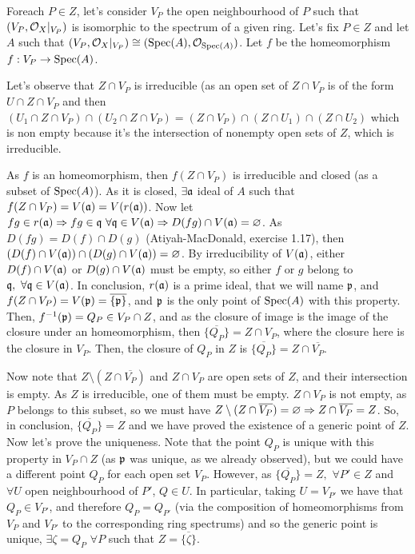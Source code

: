 \begin{sol}
	Foreach $P \in Z$, let's consider $V_P$ the open neighbourhood of $P$ such that $(V_P, \mathcal{O}_X|_{V_P})$ is isomorphic to the spectrum of a given ring. Let's fix $P \in Z$ and let $A$ such that $(V_P, \mathcal{O}_X|_{V_P}) \cong (\mathrm{Spec}(A), \mathcal{O}_{\mathrm{Spec}(A)})$. Let $f$ be the homeomorphism $f: V_P \to \mathrm{Spec}(A)$.

	Let's observe that $Z \cap V_P$ is irreducible (as an open set of $Z \cap V_P$ is of the form $U \cap Z \cap V_P$ and then $(U_1 \cap Z \cap V_P) \cap (U_2 \cap Z \cap V_P) = (Z \cap V_P) \cap (Z \cap U_1) \cap (Z \cap U_2)$ which is non empty because it's the intersection of nonempty open sets of $Z$, which is irreducible.

	As $f$ is an homeomorphism, then $f(Z\cap V_P)$ is irreducible and closed (as a subset of $\mathrm{Spec}(A)$). As it is closed, $\exists \mathfrak{a}$ ideal of $A$ such that $f(Z \cap V_P) = V(\mathfrak{a}) = V(r(\mathfrak{a}))$. Now let $fg \in r(\mathfrak{a}) \Rightarrow fg \in \mathfrak{q} \, \, \forall \mathfrak{q} \in V(\mathfrak{a}) \Rightarrow D(fg) \cap V(\mathfrak{a}) = \varnothing$. As $D(fg) = D(f) \cap D(g)$ (Atiyah-MacDonald, exercise 1.17), then $(D(f) \cap V(\mathfrak{a})) \cap (D(g) \cap V(\mathfrak{a})) = \varnothing$. By irreducibility of $V(\mathfrak{a})$, either $D(f) \cap V(\mathfrak{a})$ or $D(g) \cap V(\mathfrak{a})$ must be empty, so either $f$ or $g$ belong to $\mathfrak{q}, \, \, \forall \mathfrak{q} \in V(\mathfrak{a})$. In conclusion, $r(\mathfrak{a})$ is a prime ideal, that we will name $\mathfrak{p}$, and $f(Z \cap V_P) = V(\mathfrak{p}) = \overline{\{\mathfrak{p}\}}$, and $\mathfrak{p}$ is the only point of $\mathrm{Spec}(A)$ with this property. Then, $f^{-1}(\mathfrak{p}) = Q_P \in V_P \cap Z$, and as the closure of image is the image of the closure under an homeomorphism, then $\overline{\{Q_P\}} = Z \cap V_P$, where the closure here is the closure in $V_P$. Then, the closure of $Q_P$ in $Z$ is $\overline{\{Q_P\}} = Z \cap \overline{V_P}$.

	Now note that $Z \setminus (Z \cap \overline{V_P})$ and $Z \cap V_P$ are open sets of $Z$, and their intersection is empty. As $Z$ is irreducible, one of them must be empty. $Z \cap V_P$ is not empty, as $P$ belongs to this subset, so we must have $Z \setminus (Z \cap \overline{V_P}) = \varnothing \Rightarrow Z \cap \overline{V_P} = Z$. So, in conclusion, $\overline{\{Q_P\}} = Z$ and we have proved the existence of a generic point of $Z$. Now let's prove the uniqueness. Note that the point $Q_P$ is unique with this property in $V_P \cap Z$ (as $\mathfrak{p}$ was unique, as we already observed), but we could have a different point $Q_P$ for each open set $V_P$. However, as $\overline{\{Q_P\}} = Z, \, \, \forall P' \in Z$ and $\forall U$ open neighbourhood of $P'$, $Q \in U$. In particular, taking $U = V_{P'}$ we have that $Q_P \in V_{P'}$, and therefore $Q_P = Q_{P'}$ (via the composition of homeomorphisms from $V_P$ and $V_{P'}$ to the corresponding ring spectrums) and so the generic point is unique, $\exists \zeta = Q_P \, \, \forall P$ such that $Z = \overline{\{\zeta\}}$.
\end{sol}

